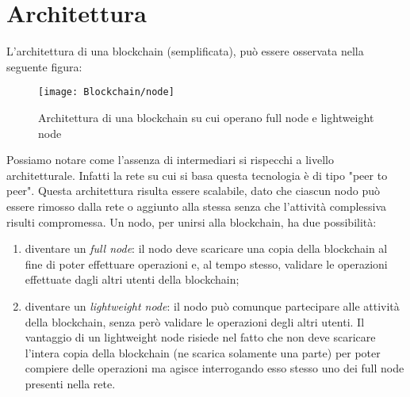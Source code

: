 \section{Architettura}
%
L'architettura di una blockchain (semplificata), può essere osservata nella seguente figura:
\begin{figure}[H]
	\centering
	\texttt{[image: Blockchain/node]}
	\caption{Architettura di una blockchain su cui operano full node e lightweight node}
	\label{fig:architettura di una blockchain}
\end{figure}
%	
Possiamo notare come l'assenza di intermediari si rispecchi a livello architetturale. Infatti la rete su cui si basa questa tecnologia è di tipo "peer to peer". Questa architettura risulta essere scalabile, dato che ciascun nodo può essere rimosso dalla rete o aggiunto alla stessa senza che l'attività complessiva risulti compromessa. Un nodo, per unirsi alla blockchain, ha due possibilità:
\begin{enumerate}
	\item diventare un \emph{full node}: il nodo deve scaricare una copia della blockchain al fine di poter effettuare operazioni e, al tempo stesso, validare le operazioni effettuate dagli altri utenti della blockchain;
	\item diventare un \emph{lightweight node}: il nodo può comunque partecipare alle attività della blockchain, senza però validare le operazioni degli altri utenti. Il vantaggio di un lightweight node risiede nel fatto che non deve scaricare l'intera copia della blockchain (ne scarica solamente una parte) per poter compiere delle operazioni ma agisce interrogando esso stesso uno dei full node presenti nella rete.
\end{enumerate}
%
